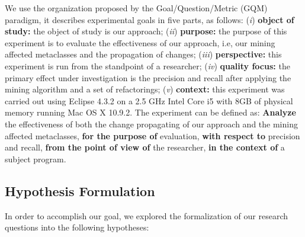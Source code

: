 We use the organization proposed by the Goal/Question/Metric (GQM) paradigm, it describes experimental goals in five parts, as follows:
%
%
%
%
%
%
%
%
(\textit{i}) \textbf{object of study:} the object of study is our approach; (\textit{ii}) \textbf{purpose:} the purpose of this experiment is to evaluate the effectiveness of our approach, i.e, our mining affected metaclasses and the propagation of changes; (\textit{iii}) \textbf{perspective:} this experiment is run from the standpoint of a researcher; (\textit{iv}) \textbf{quality focus:} the primary effect under investigation is the precision and recall after applying the mining algorithm and a set of refactorings; (\textit{v}) \textbf{context:} this experiment was carried out using Eclipse 4.3.2 on a 2.5 GHz Intel Core i5 with 8GB of physical memory running Mac OS X 10.9.2.
The experiment can be defined as: \textbf{Analyze} the effectiveness of both the change propagating of our approach and the mining affected metaclasses, \textbf{for the purpose of} evaluation, \textbf{with respect to} precision and recall, \textbf{from the point of view of} the researcher, \textbf{in the context of} a subject program. 

\subsection{Hypothesis Formulation}\label{hypothesis_formulation}	
In order to accomplish our goal, we explored the formalization of our research questions into the following hypotheses:



